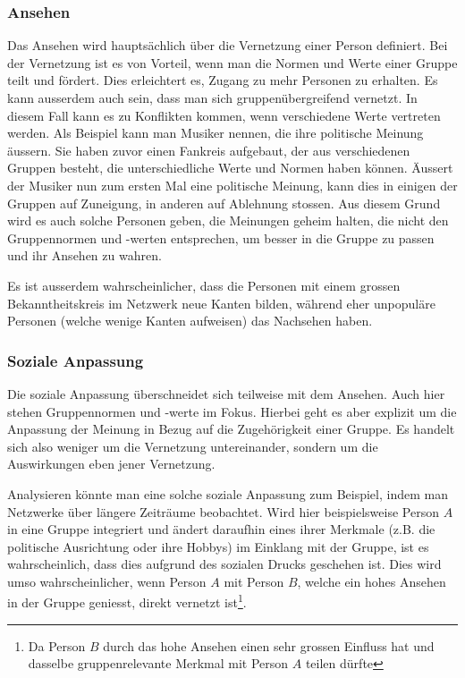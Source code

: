 \subsubsection{Ansehen}
Das Ansehen wird hauptsächlich über die Vernetzung einer Person definiert. Bei der Vernetzung ist es von Vorteil, wenn
man die Normen und Werte einer Gruppe teilt und fördert. Dies erleichtert es, Zugang zu mehr Personen zu erhalten. Es
kann ausserdem auch sein, dass man sich gruppenübergreifend vernetzt. In diesem Fall kann es zu Konflikten kommen, wenn
verschiedene Werte vertreten werden. Als Beispiel kann man Musiker nennen, die ihre politische Meinung äussern. Sie
haben zuvor einen Fankreis aufgebaut, der aus verschiedenen Gruppen besteht, die unterschiedliche Werte und Normen
haben können. Äussert der Musiker nun zum ersten Mal eine politische Meinung, kann dies in einigen der Gruppen auf
Zuneigung, in anderen auf Ablehnung stossen. Aus diesem Grund wird es auch solche Personen geben, die Meinungen geheim halten, die
nicht den Gruppennormen und -werten entsprechen, um besser in die Gruppe zu passen und ihr Ansehen zu wahren.

Es ist ausserdem wahrscheinlicher, dass die Personen mit einem grossen Bekanntheitskreis im Netzwerk neue Kanten bilden, während eher
unpopuläre Personen (welche wenige Kanten aufweisen) das Nachsehen haben.

\subsubsection{Soziale Anpassung}
Die soziale Anpassung überschneidet sich teilweise mit dem Ansehen. Auch hier stehen Gruppennormen und -werte im Fokus. Hierbei
geht es aber explizit um die Anpassung der Meinung in Bezug auf die Zugehörigkeit einer Gruppe. Es handelt sich also weniger
um die Vernetzung untereinander, sondern um die Auswirkungen eben jener Vernetzung.

Analysieren könnte man eine solche soziale Anpassung zum Beispiel, indem man Netzwerke über längere Zeiträume
beobachtet. Wird hier beispielsweise Person $A$ in eine Gruppe integriert und ändert daraufhin eines ihrer Merkmale
(z.B. die politische Ausrichtung oder ihre Hobbys) im Einklang mit der Gruppe, ist es
wahrscheinlich, dass dies aufgrund des sozialen Drucks geschehen ist.
Dies wird umso wahrscheinlicher, wenn Person $A$ mit Person $B$,
welche ein hohes Ansehen in der Gruppe geniesst, direkt vernetzt ist\footnote{Da Person $B$ durch das hohe Ansehen einen sehr grossen Einfluss hat und dasselbe
gruppenrelevante Merkmal mit Person $A$ teilen dürfte}.

